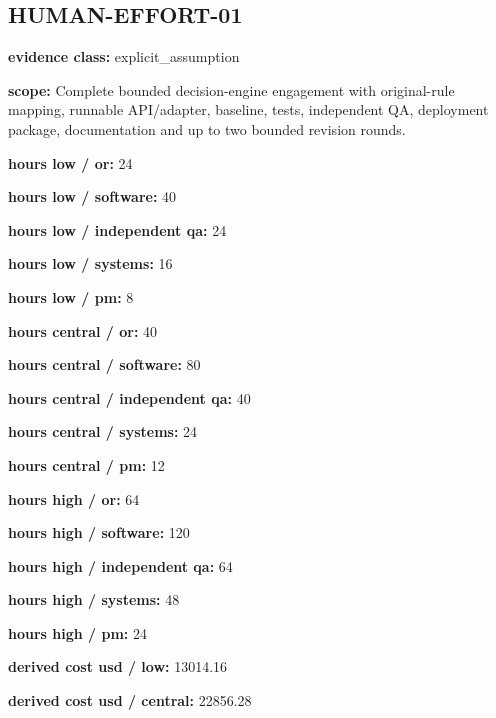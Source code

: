 \documentclass[10pt]{article}
\begin{document}
\subsection*{HUMAN-EFFORT-01}

\textbf{evidence class:} explicit\_\allowbreak{}assumption\par

\textbf{scope:} Complete bounded decision-engine engagement with original-rule mapping, runnable API/adapter, baseline, tests, independent QA, deployment package, documentation and up to two bounded revision rounds.\par

\textbf{hours low / or:} 24\par

\textbf{hours low / software:} 40\par

\textbf{hours low / independent qa:} 24\par

\textbf{hours low / systems:} 16\par

\textbf{hours low / pm:} 8\par

\textbf{hours central / or:} 40\par

\textbf{hours central / software:} 80\par

\textbf{hours central / independent qa:} 40\par

\textbf{hours central / systems:} 24\par

\textbf{hours central / pm:} 12\par

\textbf{hours high / or:} 64\par

\textbf{hours high / software:} 120\par

\textbf{hours high / independent qa:} 64\par

\textbf{hours high / systems:} 48\par

\textbf{hours high / pm:} 24\par

\textbf{derived cost usd / low:} 13014.16\par

\textbf{derived cost usd / central:} 22856.28\par
\end{document}
